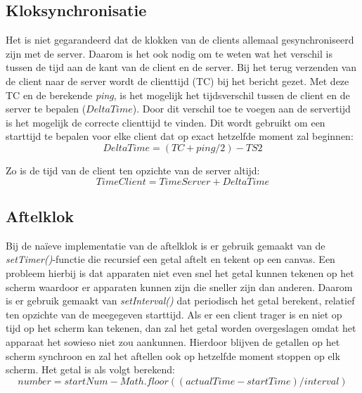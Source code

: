 \subsection{Kloksynchronisatie}
Het is niet gegarandeerd dat de klokken van de clients allemaal gesynchroniseerd zijn met de server. Daarom is het ook nodig om te weten wat het verschil is tussen de tijd aan de kant van de client en de server.
Bij het terug verzenden van de client naar de server wordt de clienttijd (TC) bij het bericht gezet. Met deze TC en de berekende {\it ping}, is het mogelijk het tijdsverschil tussen de client en de server te bepalen ($DeltaTime$). Door dit verschil toe te voegen aan de servertijd is het mogelijk de correcte clienttijd te vinden. Dit wordt gebruikt om een starttijd te bepalen voor elke client dat op exact hetzelfde moment zal beginnen:
\[DeltaTime = (TC+ping/2) - TS2\]

Zo is de tijd van de client ten opzichte van de server altijd:
\[TimeClient = TimeServer + DeltaTime\]


\subsection{Aftelklok}
Bij de naïeve implementatie van de aftelklok is er gebruik gemaakt van de {\it setTimer()}-functie die recursief een getal aftelt en tekent op een canvas. Een probleem hierbij is dat apparaten niet even snel het getal kunnen tekenen op het scherm waardoor er apparaten kunnen zijn die sneller zijn dan anderen.
Daarom is er gebruik gemaakt van {\it setInterval()} dat periodisch het getal berekent, relatief ten opzichte van de meegegeven starttijd. Als er een client trager is en niet op tijd op het scherm kan tekenen, dan zal het getal worden overgeslagen omdat het apparaat het sowieso niet zou aankunnen. Hierdoor blijven de getallen op het scherm synchroon en zal het aftellen ook op hetzelfde moment stoppen op elk scherm.
Het getal is als volgt berekend:
\[number = startNum - Math.floor((actualTime - startTime) / interval)\]


